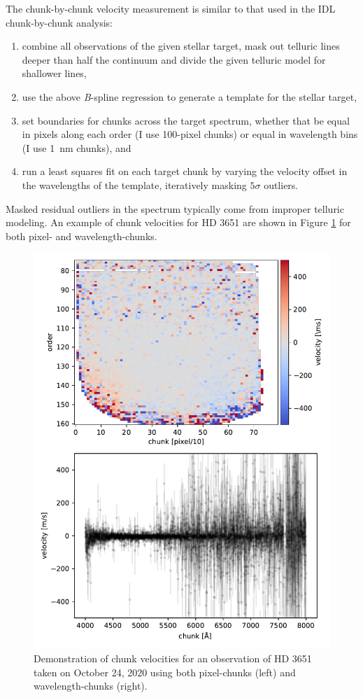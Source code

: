 The chunk-by-chunk velocity measurement is similar to that used in the IDL chunk-by-chunk analysis:
\begin{enumerate}
    \item combine all observations of the given stellar target, mask out telluric lines deeper than half the continuum and divide the given telluric model for shallower lines,
    \item use the above \textit{B}-spline regression to generate a template for the stellar target,
    \item set boundaries for chunks across the target spectrum, whether that be equal in pixels along each order (I use 100-pixel chunks) or equal in wavelength bins (I use 1~nm chunks), and
    \item run a least squares fit on each target chunk by varying the velocity offset in the wavelengths of the template, iteratively masking $5\sigma$ outliers.
\end{enumerate}
Masked residual outliers in the spectrum typically come from improper telluric modeling. An example of chunk velocities for HD 3651 are shown in Figure \ref{fig:chunk-vels} for both pixel- and wavelength-chunks.

\begin{figure}
    \centering
    \includegraphics{figures-5/chunk-vels.pdf}
    \caption{Demonstration of chunk velocities for an observation of HD 3651 taken on October 24, 2020 using both pixel-chunks (left) and wavelength-chunks (right).}
    \label{fig:chunk-vels}
\end{figure}


